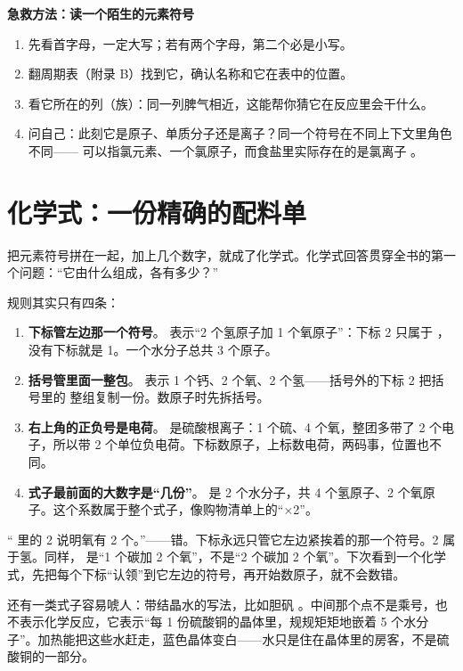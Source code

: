 \textbf{急救方法：读一个陌生的元素符号}

\begin{enumerate}[itemsep=2pt]
\item 先看首字母，一定大写；若有两个字母，第二个必是小写。
\item 翻周期表（附录 B）找到它，确认名称和它在表中的位置。
\item 看它所在的列（族）：同一列脾气相近，这能帮你猜它在反应里会干什么。
\item 问自己：此刻它是原子、单质分子还是离子？同一个符号在不同上下文里角色不同—— 可以指氯元素、一个氯原子，而食盐里实际存在的是氯离子 。
\end{enumerate}

\section{化学式：一份精确的配料单}

把元素符号拼在一起，加上几个数字，就成了化学式。化学式回答贯穿全书的第一个问题：“它由什么组成，各有多少？”

规则其实只有四条：

\begin{enumerate}[itemsep=2pt]
\item \textbf{下标管左边那一个符号}。 表示“2 个氢原子加 1 个氧原子”：下标 2 只属于 ， 没有下标就是 1。一个水分子总共 3 个原子。
\item \textbf{括号管里面一整包}。 表示 1 个钙、2 个氧、2 个氢——括号外的下标 2 把括号里的  整组复制一份。数原子时先拆括号。
\item \textbf{右上角的正负号是电荷}。 是硫酸根离子：1 个硫、4 个氧，整团多带了 2 个电子，所以带 2 个单位负电荷。下标数原子，上标数电荷，两码事，位置也不同。
\item \textbf{式子最前面的大数字是“几份”}。 是 2 个水分子，共 4 个氢原子、2 个氧原子。这个系数属于整个式子，像购物清单上的“×2”。
\end{enumerate}

\begin{wuqu}
“ 里的 2 说明氧有 2 个。”——错。下标永远只管它左边紧挨着的那一个符号。2 属于氢。同样， 是“1 个碳加 2 个氧”，不是“2 个碳加 2 个氧”。下次看到一个化学式，先把每个下标“认领”到它左边的符号，再开始数原子，就不会数错。
\end{wuqu}

还有一类式子容易唬人：带结晶水的写法，比如胆矾 。中间那个点不是乘号，也不表示化学反应，它表示“每 1 份硫酸铜的晶体里，规规矩矩地嵌着 5 个水分子”。加热能把这些水赶走，蓝色晶体变白——水只是住在晶体里的房客，不是硫酸铜的一部分。

